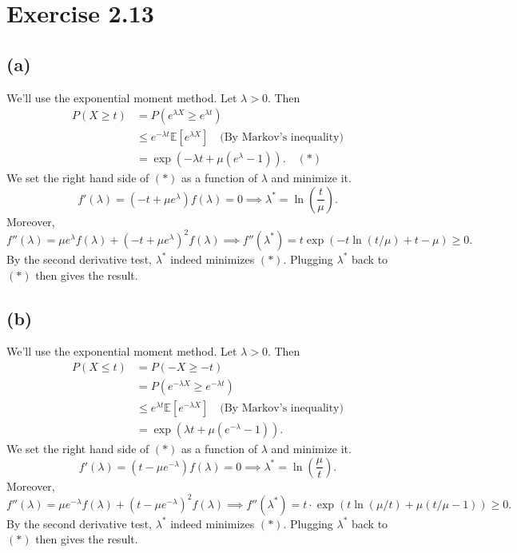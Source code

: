 \newpage
\section*{Exercise 2.13}
\subsection*{(a)}
We'll use the exponential moment method. Let $\lambda > 0$. Then 
\begin{align*}
	P(X \geq t) 
	&= P(e^{\lambda X} \geq e^{\lambda t}) \\
	&\leq e^{-\lambda t}\mathbb{E}\left[ e^{\lambda X} \right] \quad \text{(By Markov's inequality)} \\
	&= \exp{(-\lambda t + \mu(e^{\lambda} - 1))}. \quad (*)
\end{align*}
We set the right hand side of $(*)$ as a function of $\lambda$ and minimize it.
\[ f'(\lambda) = (-t + \mu e^{\lambda}) f(\lambda) = 0 \implies \lambda^* = \ln{\left( \frac{t}{\mu} \right)}. \]
Moreover, 
\[ f''(\lambda) = \mu e^{\lambda} f(\lambda) + (-t + \mu e^\lambda)^2 f(\lambda) 
\implies f''(\lambda^*) = t \exp{(-t \ln{(t/\mu)} + t - \mu)} \geq 0. \]
By the second derivative test, $\lambda^*$ indeed minimizes $(*)$. Plugging $\lambda^*$ back to $(*)$ then 
gives the result.

\subsection*{(b)}
We'll use the exponential moment method. Let $\lambda > 0$. Then 
\begin{align*}
	P(X \leq t) 
	&= P(-X \geq -t) \\
	&= P(e^{-\lambda X} \geq e^{-\lambda t}) \\
	&\leq e^{\lambda t} \mathbb{E}\left[ e^{-\lambda X} \right] \quad \text{(By Markov's inequality)} \\
	&= \exp{(\lambda t + \mu(e^{-\lambda} - 1))}.
\end{align*}
We set the right hand side of $(*)$ as a function of $\lambda$ and minimize it.
\[ f'(\lambda) = (t - \mu e^{-\lambda}) f(\lambda) = 0 \implies \lambda^* = \ln{\left( \frac{\mu}{t} \right)}. \]
Moreover, 
\[ f''(\lambda) = \mu e^{-\lambda} f(\lambda) + (t - \mu e^{-\lambda})^2 f(\lambda) 
\implies f''(\lambda^*) = t \cdot \exp{(t \ln{(\mu / t)} + \mu (t/\mu - 1))} \geq 0. \]
By the second derivative test, $\lambda^*$ indeed minimizes $(*)$. Plugging $\lambda^*$ back to $(*)$ then 
gives the result.

